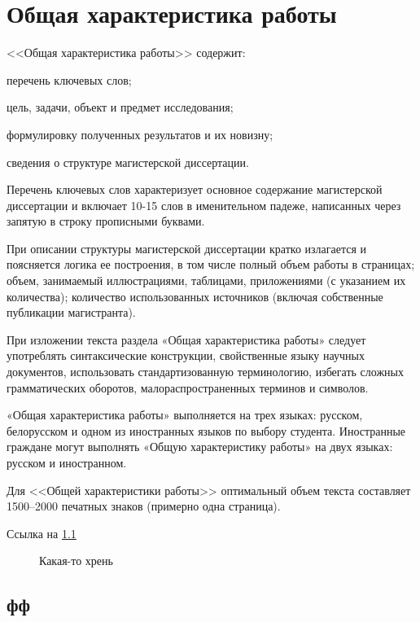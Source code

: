 \documentclass{mpaper}
\begin{document}
    \chapter{Общая характеристика работы}
    <<Общая характеристика работы>> содержит:

    перечень ключевых слов;

    цель, задачи, объект и предмет исследования;

    формулировку полученных результатов и их новизну;

    сведения о структуре магистерской диссертации.

    Перечень ключевых слов характеризует основное содержание магистерской диссертации и включает 10-15 слов в именительном падеже, написанных через запятую в строку прописными буквами.

    При описании структуры магистерской диссертации кратко излагается и поясняется логика ее построения, в том числе полный объем работы в страницах; объем, занимаемый иллюстрациями, таблицами, приложениями (с указанием их количества); количество использованных источников (включая собственные публикации магистранта).

    При изложении текста раздела «Общая характеристика работы»
    следует употреблять синтаксические конструкции, свойственные языку
    научных документов, использовать стандартизованную терминологию,
    избегать сложных грамматических оборотов, малораспространенных
    терминов и символов.

    «Общая характеристика работы» выполняется на трех языках: русском, белорусском и одном из иностранных языков по выбору студента. Иностранные граждане могут выполнять «Общую характеристику работы» на двух языках: русском и иностранном.

    Для <<Общей характеристики работы>> оптимальный объем текста составляет 1500--2000 печатных знаков (примерно одна страница).

    Ссылка на \cref{fig:1}
    \begin{figure}
        \centering
        \caption{Какая-то хрень}\label{fig:1}
    \end{figure}

    \section{фф}
\end{document}
